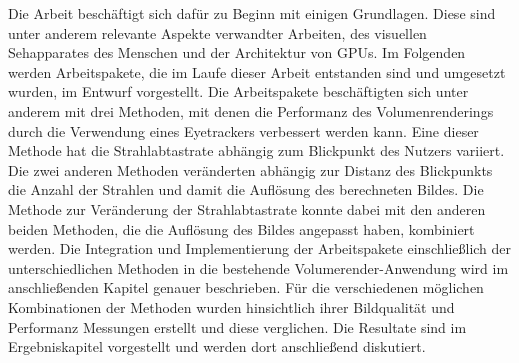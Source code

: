 Die Arbeit beschäftigt sich dafür zu Beginn mit einigen Grundlagen. 
Diese sind unter anderem relevante Aspekte verwandter Arbeiten, des visuellen Sehapparates des Menschen und der Architektur von GPUs.
Im Folgenden werden Arbeitspakete, die im Laufe dieser Arbeit entstanden sind und umgesetzt wurden, im Entwurf vorgestellt.
Die Arbeitspakete beschäftigten sich unter anderem mit drei Methoden, mit denen die Performanz des Volumenrenderings durch die Verwendung eines Eyetrackers verbessert werden kann.
Eine dieser Methode hat die Strahlabtastrate abhängig zum Blickpunkt des Nutzers variiert.
Die zwei anderen Methoden veränderten abhängig zur Distanz des Blickpunkts die Anzahl der Strahlen und damit die Auflösung des berechneten Bildes.
Die Methode zur Veränderung der Strahlabtastrate konnte dabei mit den anderen beiden Methoden, die die Auflösung des Bildes angepasst haben, kombiniert werden.
Die Integration und Implementierung der Arbeitspakete einschließlich der unterschiedlichen Methoden in die bestehende Volumerender-Anwendung wird im anschließenden Kapitel genauer beschrieben.
Für die verschiedenen möglichen Kombinationen der Methoden wurden hinsichtlich ihrer Bildqualität und Performanz Messungen erstellt und diese verglichen.
Die Resultate sind im Ergebniskapitel vorgestellt und werden dort anschließend diskutiert.